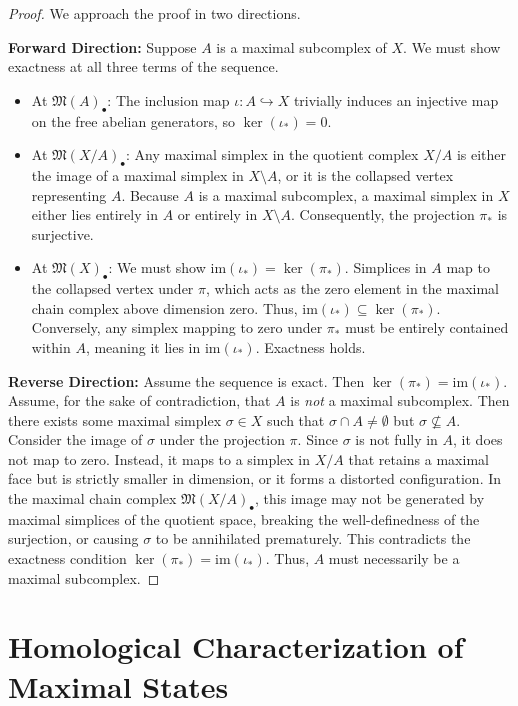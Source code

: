 \begin{proof}
We approach the proof in two directions.

\textbf{Forward Direction:} Suppose $A$ is a maximal subcomplex of $X$. We must show exactness at all three terms of the sequence.
\begin{itemize}
    \item At $\mathfrak{M}(A)_{\bullet}$: The inclusion map $\iota: A \hookrightarrow X$ trivially induces an injective map on the free abelian generators, so $\ker(\iota_*) = 0$.
    \item At $\mathfrak{M}(X/A)_{\bullet}$: Any maximal simplex in the quotient complex $X/A$ is either the image of a maximal simplex in $X \setminus A$, or it is the collapsed vertex representing $A$. Because $A$ is a maximal subcomplex, a maximal simplex in $X$ either lies entirely in $A$ or entirely in $X \setminus A$. Consequently, the projection $\pi_*$ is surjective.
    \item At $\mathfrak{M}(X)_{\bullet}$: We must show $\text{im}(\iota_*) = \ker(\pi_*)$. Simplices in $A$ map to the collapsed vertex under $\pi$, which acts as the zero element in the maximal chain complex above dimension zero. Thus, $\text{im}(\iota_*) \subseteq \ker(\pi_*)$. Conversely, any simplex mapping to zero under $\pi_*$ must be entirely contained within $A$, meaning it lies in $\text{im}(\iota_*)$. Exactness holds.
\end{itemize}

\textbf{Reverse Direction:} Assume the sequence is exact. Then $\ker(\pi_*) = \text{im}(\iota_*)$. Assume, for the sake of contradiction, that $A$ is \textit{not} a maximal subcomplex. Then there exists some maximal simplex $\sigma \in X$ such that $\sigma \cap A \neq \emptyset$ but $\sigma \not\subseteq A$. 
Consider the image of $\sigma$ under the projection $\pi$. Since $\sigma$ is not fully in $A$, it does not map to zero. Instead, it maps to a simplex in $X/A$ that retains a maximal face but is strictly smaller in dimension, or it forms a distorted configuration. In the maximal chain complex $\mathfrak{M}(X/A)_{\bullet}$, this image may not be generated by maximal simplices of the quotient space, breaking the well-definedness of the surjection, or causing $\sigma$ to be annihilated prematurely. This contradicts the exactness condition $\ker(\pi_*) = \text{im}(\iota_*)$. Thus, $A$ must necessarily be a maximal subcomplex.
\end{proof}

\section{Homological Characterization of Maximal States}

